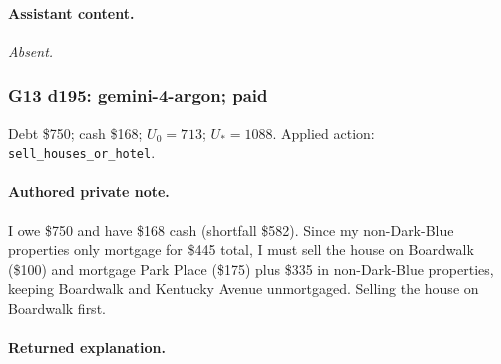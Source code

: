 \paragraph{Assistant content.}

\textit{Absent.}

\medskip

\subsubsection*{G13 d195: gemini-4-argon; paid}

Debt \$750; cash \$168; $U_0=713$; $U_*=1088$. Applied action: \texttt{sell\_houses\_or\_hotel}.

\paragraph{Authored private note.}

{\small I owe \$750 and have \$168 cash (shortfall \$582). Since my non-Dark-Blue properties only mortgage for \$445 total, I must sell the house on Boardwalk (\$100) and mortgage Park Place (\$175) plus \$335 in non-Dark-Blue properties, keeping Boardwalk and Kentucky Avenue unmortgaged. Selling the house on Boardwalk first.\par}

\paragraph{Returned explanation.}

